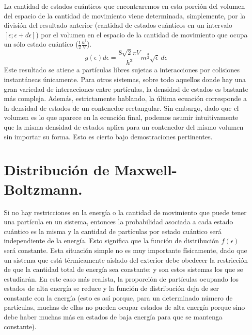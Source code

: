 \documentclass[12pt,a4paper]{article}
\def\e{{\epsilon}} %
\begin{document}
La cantidad de estados cuánticos que encontraremos en esta porción del volumen del espacio de la cantidad de movimiento viene determinada, simplemente, por la división del resultado anterior (cantidad de estados cuánticos en un intervalo $[\e;\e+d\e]$) por el volumen en el espacio de la cantidad de movimiento que ocupa un sólo estado cuántico ($\frac{1}{2} \frac{h^{3}}{V}$).
\[ g(\e)d\e=\frac{8\sqrt{2} \pi V}{h^{3}}m^{\frac{3}{2}} \sqrt{\e} \, d\e \]
Este resultado se atiene a partículas libres sujetas a interacciones por colisiones instantáneas únicamente. Para otros sistemas, sobre todo aquellos donde hay una gran variedad de interacciones entre partículas, la densidad de estados es bastante más compleja. Además, estrictamente hablando, la última ecuación corresponde a la densidad de estados de un contenedor rectangular. Sin embargo, dado que el volumen es lo que aparece en la ecuación final, podemos asumir intuitivamente que la misma densidad de estados aplica para un contenedor del mismo volumen sin importar su forma. Esto es cierto bajo demostraciones pertinentes.

\section{Distribución de Maxwell-Boltzmann.}

Si no hay restricciones en la energía o la cantidad de movimiento que puede tener una partícula en un sistema, entonces la probabilidad asociada a cada estado cuántico es la misma y la cantidad de partículas por estado cuántico será independiente de la energía. Esto significa que la función de distribución $f(\e)$ será constante. Esta situación simple no es muy importante físicamente, dado que un sistema que está térmicamente aislado del exterior debe obedecer la restricción de que la cantidad total de energía sea constante; y son estos sistemas los que se estudiarán. En este caso más realista, la proporción de partículas ocupando los estados de alta energía se reduce y la función de distribución deja de ser constante con la energía (esto es así porque, para un determinado número de partículas, muchas de ellas no pueden ocupar estados de alta energía porque sino debe haber muchas más en estados de baja energía para que se mantenga constante).
\end{document}
